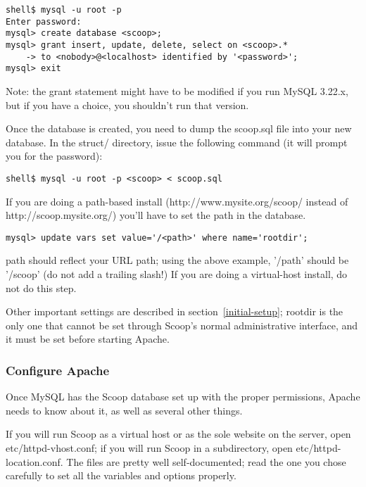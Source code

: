 \begin{verbatim}
shell$ mysql -u root -p
Enter password: 
mysql> create database <scoop>;
mysql> grant insert, update, delete, select on <scoop>.* 
    -> to <nobody>@<localhost> identified by '<password>';
mysql> exit
\end{verbatim}

Note: the grant statement might have to be modified if you run MySQL 3.22.x, but if you have a choice, you shouldn't run that version.

Once the database is created, you need to dump the scoop.sql file into your new database.  In the struct/ directory, issue the following command (it will prompt you for the password):

\begin{verbatim}
shell$ mysql -u root -p <scoop> < scoop.sql
\end{verbatim}

If you are doing a path-based install (http://www.mysite.org/scoop/ instead of http://scoop.mysite.org/) you'll have to set the path in the database.

\begin{verbatim}
mysql> update vars set value='/<path>' where name='rootdir';
\end{verbatim}

\latexhtml{$<$}{<}path\latexhtml{$>$}{>} should reflect your URL path; using the above example, '/\latexhtml{$<$}{<}path\latexhtml{$>$}{>}' should be '/scoop' (do not add a trailing slash!)  If you are doing a virtual-host install, do not do this step.

Other important settings are described in section~\ref{initial-setup}; rootdir is the only one that cannot be set through Scoop's normal administrative interface, and it must be set before starting Apache.

\subsubsection{Configure Apache}
\label{apache-config}

Once MySQL has the Scoop database set up with the proper permissions, Apache needs to know about it, as well as several other things.

If you will run Scoop as a virtual host or as the sole website on the server, open etc/httpd-vhost.conf; if you will run Scoop in a subdirectory, open etc/httpd-location.conf.  The files are pretty well self-documented; read the one you chose carefully to set all the variables and options properly.

